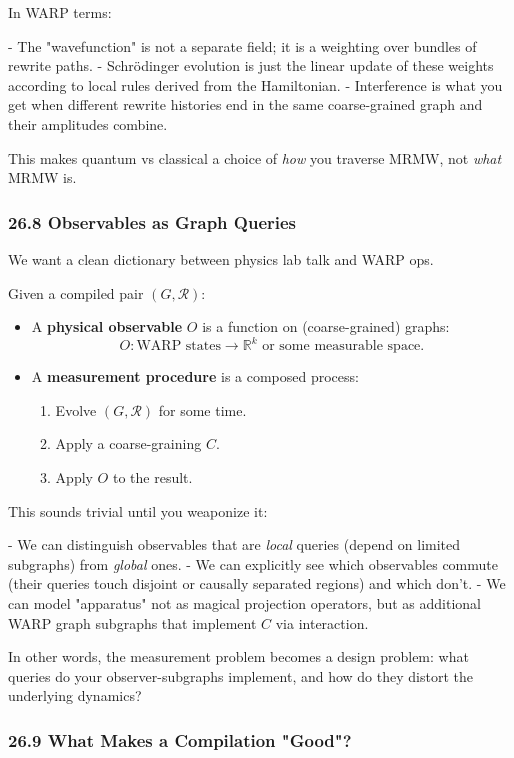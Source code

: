 In WARP terms:

- The "wavefunction" is not a separate field; it is a weighting over bundles of rewrite paths.
- Schrödinger evolution is just the linear update of these weights according to local rules derived from the Hamiltonian.
- Interference is what you get when different rewrite histories end in the same coarse-grained graph and their amplitudes combine.

This makes quantum vs classical a choice of \emph{how} you traverse MRMW, not \emph{what} MRMW is.

\subsubsection*{26.8  Observables as Graph Queries}

We want a clean dictionary between physics lab talk and WARP ops.

Given a compiled pair $(G,\mathcal{R})$:

\begin{itemize}
  \item A \textbf{physical observable} $O$ is a function on (coarse-grained) graphs:
    \[
      O : \text{WARP states} \to \mathbb{R}^k \text{ or some measurable space}.
    \]
  \item A \textbf{measurement procedure} is a composed process:
    \begin{enumerate}
      \item Evolve $(G,\mathcal{R})$ for some time.
      \item Apply a coarse-graining $C$.
      \item Apply $O$ to the result.
    \end{enumerate}
\end{itemize}

This sounds trivial until you weaponize it:

- We can distinguish observables that are \emph{local} queries (depend on limited subgraphs) from \emph{global} ones.
- We can explicitly see which observables commute (their queries touch disjoint or causally separated regions) and which don’t.
- We can model "apparatus" not as magical projection operators, but as additional WARP graph subgraphs that implement $C$ via interaction.

In other words, the measurement problem becomes a design problem: what queries do your observer-subgraphs implement, and how do they distort the underlying dynamics?

\subsubsection*{26.9  What Makes a Compilation "Good"?}

